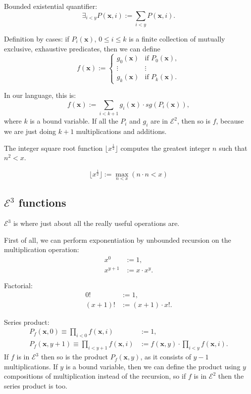 \documentclass[a4paper]{article}
\newcommand{\grz}[1]{$\mathcal{E}^{#1}$}	%
\newcommand{\xvec}{\mathbf{x}}	%
\newcommand{\recur}[1]{\begin{equation} \begin{split} #1 \end{split} \end{equation}}	%
\theoremstyle{plain}
\theoremstyle{definition}
\begin{document}
Bounded existential quantifier:
\begin{equation} \exists_{i < y} P(\xvec,i) := \sum_{i < y} P(\xvec,i). \end{equation}


Definition by cases: if  $P_i(\xvec)$, $0 \leq i \leq k$ is a finite collection of mutually exclusive, exhaustive predicates, then we can define
\[ f(\xvec) := \begin{cases}
	g_0(\xvec) & \textrm{if }P_0(\xvec),	\\
	\vdots & \vdots	\\
	g_k(\xvec) & \textrm{if } P_k(\xvec).
\end{cases} \]

In our language, this is:
\begin{equation} f(\xvec) := \sum_{i < k+1} g_i(\xvec) \cdot sg(P_i(\xvec)), \end{equation}
where $k$ is a bound variable. If all the $P_i$ and $g_i$ are in \grz{2}, then so is $f$, because we are just doing $k+1$ multiplications and additions.

The integer square root function $\lfloor x^{\frac{1}{2}} \rfloor$ computes the greatest integer $n$ such that $n^2 < x$.

\[ \lfloor x^{\frac{1}{2}} \rfloor := \max_{n < x}{\left ( n \cdot n < x \right )} \]

\subsection{\grz{3} functions}
\grz{3} is where just about all the really useful operations are.

First of all, we can perform exponentiation by unbounded recursion on the multiplication operation:
\recur{
	x^0 &:= 1,				\\
	x^{y+1} &:= x \cdot x^y.
}

Factorial:
\recur{
	0! &:= 1,	\\
	(x+1)! &:= (x+1) \cdot x!.
}

Series product:
\recur{
	P_f(\xvec,0) \equiv \prod_{i < 0} f(\xvec,i) &:= 1,	\\
	P_f(\xvec,y+1) \equiv \prod_{i < y+1} f(\xvec,i) &:= f(\xvec,y) \cdot \prod_{i < y} f(\xvec, i).
}
If $f$ is in \grz{3} then so is the product $P_f(\xvec,y)$, as it consists of $y-1$ multiplications. If $y$ is a bound variable, then we can define the product using $y$ compositions of multiplication instead of the recursion, so if $f$ is in \grz{2} then the series product is too.
\end{document}

